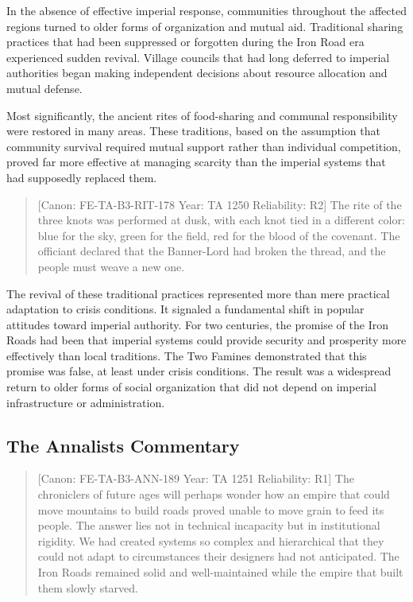 In the absence of effective imperial response, communities throughout
the affected regions turned to older forms of organization and mutual
aid. Traditional sharing practices that had been suppressed or forgotten
during the Iron Road era experienced sudden revival. Village councils
that had long deferred to imperial authorities began making independent
decisions about resource allocation and mutual defense.

Most significantly, the ancient rites of food-sharing and communal
responsibility were restored in many areas. These traditions, based on
the assumption that community survival required mutual support rather
than individual competition, proved far more effective at managing
scarcity than the imperial systems that had supposedly replaced them.

\begin{quote}
{[}Canon: FE-TA-B3-RIT-178 \textbar{} Year: TA 1250 \textbar{}
Reliability: R2{]} The rite of the three knots was performed at dusk,
with each knot tied in a different color: blue for the sky, green for
the field, red for the blood of the covenant. The officiant declared
that the Banner-Lord had broken the thread, and the people must weave a
new one.
\end{quote}

The revival of these traditional practices represented more than mere
practical adaptation to crisis conditions. It signaled a fundamental
shift in popular attitudes toward imperial authority. For two centuries,
the promise of the Iron Roads had been that imperial systems could
provide security and prosperity more effectively than local traditions.
The Two Famines demonstrated that this promise was false, at least under
crisis conditions. The result was a widespread return to older forms of
social organization that did not depend on imperial infrastructure or
administration.

\subsection{The Annalist\textquotesingle s
Commentary}\label{the-annalists-commentary-1}

\begin{quote}
{[}Canon: FE-TA-B3-ANN-189 \textbar{} Year: TA 1251 \textbar{}
Reliability: R1{]} The chroniclers of future ages will perhaps wonder
how an empire that could move mountains to build roads proved unable to
move grain to feed its people. The answer lies not in technical
incapacity but in institutional rigidity. We had created systems so
complex and hierarchical that they could not adapt to circumstances
their designers had not anticipated. The Iron Roads remained solid and
well-maintained while the empire that built them slowly starved.
\end{quote}

